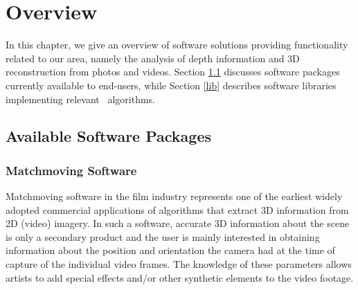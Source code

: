 \chapter{Overview}
\label{chap:overview} 

In this chapter, we give an overview of software solutions providing functionality related to our area, namely the analysis of depth information and 3D reconstruction from photos and videos. 
Section \ref{soft} discusses software packages currently available to end-users, while Section \ref{lib} describes software libraries implementing relevant \cv\ algorithms. 

\section{Available Software Packages}
\label{soft} 


\subsection{Matchmoving Software} 

Matchmoving software in the film industry represents one of the earliest widely adopted commercial applications of algorithms that extract 3D information from 2D (video) imagery.
In such a software, accurate 3D information about the scene is only a secondary product and the user is mainly interested in obtaining information about the position and orientation the camera had at the time of capture of the individual video frames.
The knowledge of these parameters allows artists to add special effects and/or other synthetic elements to the video footage. 

